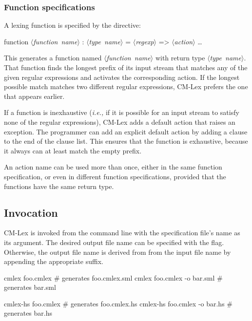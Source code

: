 \documentclass[10pt]{article}
\newcommand{\nonterm}[1]{\mbox{$\langle${\it{}#1}$\rangle$}}
\begin{document}
\subsubsection{Function specifications}

A lexing function is specified by the directive:

\begin{code}
function \nonterm{function name} : \nonterm{type name} =
   \nonterm{regexp} => \nonterm{action}
   \dots
\end{code}

This generates a function named \nonterm{function name} with return type
\nonterm{type name}.  That function finds the longest prefix of its input
stream that matches any of the given regular expressions and activates
the corresponding action.  If the longest possible match matches two
different regular expressions, CM-Lex prefers the one that appears
earlier.

If a function is inexhaustive ({\em i.e.,} if it is possible for an input
stream to satisfy none of the regular expressions), CM-Lex adds a
default action that raises an exception.  The programmer can add an
explicit default action by adding a clause 
to the end of the clause list.  This ensures that the function is
exhaustive, because it always can at least match the empty prefix.

An action name can be used more than once, either in the same function
specification, or even in different function specifications, provided
that the functions have the same return type.


\subsection{Invocation}

CM-Lex is invoked from the command line with the specification file's
name as its argument.  The desired output file name can be specified
with the  flag.  Otherwise, the output file name is derived from from
the input file name by appending the appropriate suffix.

\begin{code}
cmlex foo.cmlex               # generates foo.cmlex.sml
cmlex foo.cmlex -o bar.sml    # generates bar.sml

cmlex-hs foo.cmlex            # generates foo.cmlex.hs
cmlex-hs foo.cmlex -o bar.hs  # generates bar.hs
\end{code}
\end{document}
